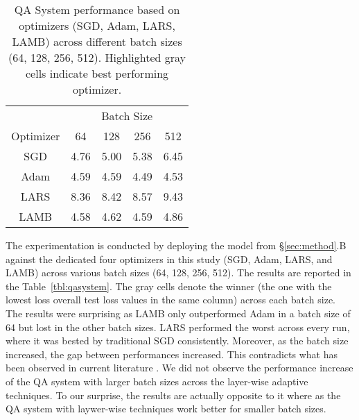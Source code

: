\begin{table}[!b]
\vspace{-5pt}
\small
\vspace{7pt}
\caption{QA System performance based on optimizers (SGD, Adam, LARS, LAMB) across different batch sizes (64, 128, 256, 512). Highlighted gray cells indicate best performing optimizer.}\label{tbl:qa_results}
\vspace{-10pt}
\begin{center}
\begin{tabular}{ c|c|c|c|c}
\multicolumn{1}{c|}{} &  \multicolumn{4}{c}{Batch Size}\\ \cline{2-5}
\multicolumn{1}{c|}{Optimizer} &
 \multicolumn{1}{c|}{64} &
 \multicolumn{1}{c|}{128} &
 \multicolumn{1}{c|}{256} &
 \multicolumn{1}{c}{512} \\
\hline
SGD & 4.76 & 5.00 & 5.38 & 6.45\\
Adam &  4.59 & \cellcolor{gray!30} 4.59 &  \cellcolor{gray!30} 4.49 & \cellcolor{gray!30} 4.53\\
LARS & 8.36 & 8.42 & 8.57 & 9.43\\
LAMB & \cellcolor{gray!30} 4.58 & 4.62 & 4.59 & 4.86\\
\end{tabular}
\end{center}
\vspace{-15pt}
\end{table}

The experimentation is conducted by deploying the model from \S\ref{sec:method}.B against the dedicated four optimizers in this study (SGD, Adam, LARS, and LAMB) across various batch sizes (64, 128, 256, 512). The results are reported in the Table~\ref{tbl:qasystem}. The gray cells denote the winner (the one with the lowest loss overall test loss values in the same column) across each batch size. The results were surprising as LAMB only outperformed Adam in a batch size of 64 but lost in the other batch sizes. LARS performed the worst across every run, where it was bested by traditional SGD consistently. Moreover, as the batch size increased, the gap between performances increased. This contradicts what has been observed in current literature \cite{ginsburg2018large, }. We did not observe the performance increase of the QA system with larger batch sizes across the layer-wise adaptive techniques. To our surprise, the results are actually opposite to it where as the QA system with laywer-wise techniques work better for smaller batch sizes. 

